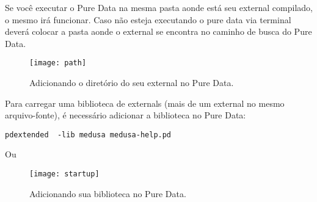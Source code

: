 Se você executar o Pure Data na mesma pasta aonde está seu external compilado,
o mesmo irá funcionar. Caso não esteja executando o pure data via terminal
deverá colocar a pasta aonde o external se encontra no caminho de busca do
Pure Data.

\begin{figure}[h!]
	\centering
	\texttt{[image: path]}
	\caption{Adicionando o diretório do seu external no Pure Data.}
\end{figure}

Para carregar uma biblioteca de externals (mais de um external no mesmo
arquivo-fonte), é necessário adicionar a biblioteca no Pure Data:

\begin{lstlisting}
pdextended  -lib medusa medusa-help.pd 
\end{lstlisting}

Ou 

\begin{figure}[h!]
	\centering
	\texttt{[image: startup]}
	\caption{Adicionando sua biblioteca no Pure Data.}
\end{figure}


